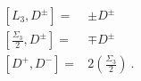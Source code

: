 \begin{equation}
\begin{array}{cc}
\left[ L_{3},D^{\pm }\right] = & \pm D^{\pm } \\
\left[ \frac{\Sigma _{3}}{2},D^{\pm }\right] = & \mp D^{\pm } \\
\left[ D^{+},D^{-}\right] = & 2\left( \frac{\Sigma _{3}}{2}\right)\ .
\end{array}
\end{equation}

